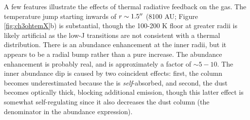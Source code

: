 \documentclass{aa}
\begin{document}
A few features illustrate the effects of thermal radiative feedback on the gas.
The temperature jump starting inwards of  $r\sim1.5\mbox{$^{\prime\prime}$}$ (8100 AU; Figure
\ref{fig:ch3ohtemX}b) is
substantial, though the 100-200 K floor at greater radii is likely artificial as
the low-J transitions are not consistent with a thermal distribution.
There is an abundance enhancement at the inner radii, but it appears to be a
radial bump rather than a pure increase.  The abundance enhancement is probably real,
and is approximately a factor of $\sim5-10$.  The inner abundance dip
is caused by two coincident effects: first, the \methanol column becomes underestimated
because the \methanol is \emph{self}-absorbed, and second, the dust becomes
optically thick, blocking additional \methanol emission, though this latter
effect is somewhat self-regulating since it also decreases the dust column (the
denominator in the abundance expression).
\end{document}
